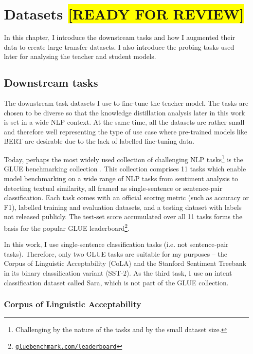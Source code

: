 \documentclass[bsc,frontabs,twoside,singlespacing,parskip,deptreport]{infthesis}
\def\reviewready{\colorbox{yellow}{[READY FOR REVIEW]}}
\newcommand\rurl[1]{%
  \href{https://#1}{\nolinkurl{#1}}%
}
\begin{document}
\chapter{Datasets \reviewready}{
  \label{chap:datasets}

  In this chapter, I introduce the downstream tasks and how I augmented their data to create large transfer datasets. I also introduce the probing tasks used later for analysing the teacher and student models.

  \section{Downstream tasks}{
    The downstream task datasets I use to fine-tune the teacher model. The tasks are chosen to be diverse so that the knowledge distillation analysis later in this work is set in a wide NLP context. At the same time, all the datasets are rather small and therefore well representing the type of use case where pre-trained models like BERT are desirable due to the lack of labelled fine-tuning data.

    Today, perhaps the most widely used collection of challenging NLP tasks\footnote{Challenging by the nature of the tasks and by the small dataset size.} is the GLUE benchmarking collection \citep{Wang_2018}. 
    This collection comprises 11 tasks which enable model benchmarking on a wide range of NLP tasks from sentiment analysis to detecting textual similarity, all framed as single-sentence or sentence-pair classification.
    Each task comes with an official scoring metric (such as accuracy or F1), labelled training and evaluation datasets, and a testing dataset with labels not released publicly.
    The test-set score accumulated over all 11 tasks forms the basis for the popular GLUE leaderboard\footnote{\rurl{gluebenchmark.com/leaderboard}}.
    
    In this work, I use single-sentence classification tasks (i.e. not sentence-pair tasks). Therefore, only two GLUE tasks are suitable for my purposes -- the Corpus of Linguistic Acceptability (CoLA) and the Stanford Sentiment Treebank in its binary classification variant (SST-2). As the third task, I use an intent classification dataset called Sara, which is not part of the GLUE collection.

    \subsection{Corpus of Linguistic Acceptability}{
      \label{sec:datasets-CoLA}

}}}
\end{document}
